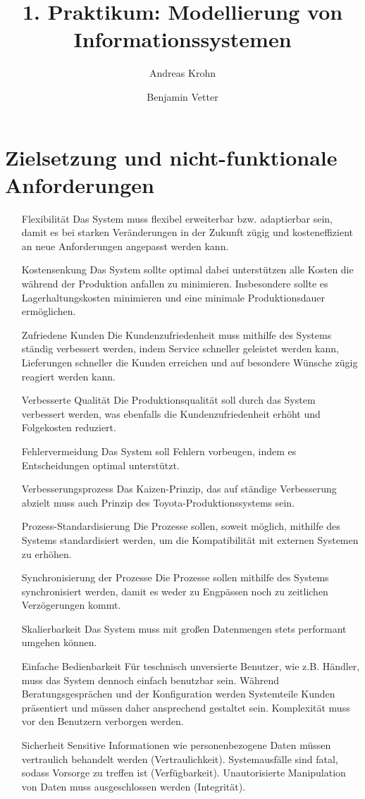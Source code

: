 \documentclass[a4paper,10pt,left=1.5cm,right=1.5cm,top=1.5cm,bottom=1.5cm]{article}
\title{1. Praktikum: Modellierung von Informationssystemen}
\author{Andreas Krohn \and Benjamin Vetter}
\begin{document}
\maketitle

\tableofcontents

\section{Zielsetzung und nicht-funktionale Anforderungen}

\begin{itemize}
  \item[Flexibilität] Das System muss flexibel erweiterbar bzw. adaptierbar sein, damit es bei starken Veränderungen in der Zukunft zügig und kosteneffizient an neue Anforderungen angepasst werden kann.
  \item[Kostensenkung] Das System sollte optimal dabei unterstützen alle Kosten die während der Produktion anfallen zu minimieren.
Insbesondere sollte es Lagerhaltungskosten minimieren und eine minimale Produktionsdauer ermöglichen.
  \item[Zufriedene Kunden] Die Kundenzufriedenheit muss mithilfe des Systems ständig verbessert werden, indem Service schneller geleistet werden kann, Lieferungen schneller die Kunden erreichen und auf besondere Wünsche zügig reagiert werden kann.
  \item[Verbesserte Qualität] Die Produktionsqualität soll durch das System verbessert werden, was ebenfalls die Kundenzufriedenheit erhöht und Folgekosten reduziert.
  \item[Fehlervermeidung] Das System soll Fehlern vorbeugen, indem es Entscheidungen optimal unterstützt.
  \item[Verbesserungsprozess] Das Kaizen-Prinzip, das auf ständige Verbesserung abzielt muss auch Prinzip des Toyota-Produktionssystems sein.
  \item[Prozess-Standardisierung] Die Prozesse sollen, soweit möglich, mithilfe des Systems standardisiert werden, um die Kompatibilität mit externen Systemen zu erhöhen.
  \item[Synchronisierung der Prozesse] Die Prozesse sollen mithilfe des Systems synchronisiert werden, damit es weder zu Engpässen noch zu zeitlichen Verzögerungen kommt.
  \item[Skalierbarkeit] Das System muss mit großen Datenmengen stets performant umgehen können.
  \item[Einfache Bedienbarkeit] Für teschnisch unversierte Benutzer, wie z.B. Händler, muss das System dennoch einfach benutzbar sein. 
Während Beratungsgesprächen und der Konfiguration werden Systemteile Kunden präsentiert und müssen daher ansprechend gestaltet sein.
Komplexität muss vor den Benutzern verborgen werden.
  \item[Sicherheit] Sensitive Informationen wie personenbezogene Daten müssen vertraulich behandelt werden (Vertraulichkeit). 
Systemausfälle sind fatal, sodass Vorsorge zu treffen ist (Verfügbarkeit). 
Unautorisierte Manipulation von Daten muss ausgeschlossen werden (Integrität).
\end{itemize}
\end{document}
